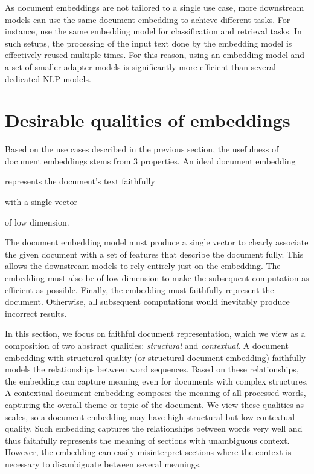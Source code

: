As document embeddings are not tailored to a single use case, more downstream models can use the same document embedding to achieve different tasks. For instance, \cite{neelakantan2022text,cohan2020specter} use the same embedding model for classification and retrieval tasks. In such setups,  the processing of  the input text done by the embedding model is effectively reused multiple times. For this reason, using an embedding model and a set of smaller adapter models is significantly more efficient than several dedicated NLP models.

\section{Desirable qualities of embeddings}

Based on the use cases described in the previous section, the usefulness of document embeddings stems from 3 properties. An ideal document embedding
\begin{enumerate*}[label=(\arabic*)]
  \item represents the document's text faithfully
  \item with a single vector
  \item of low dimension.
\end{enumerate*} The document embedding model must produce a single vector to clearly associate the given document with a set of features that describe the document fully. This allows the downstream models to rely entirely just on the embedding. The embedding must also be of low dimension to make the subsequent computation as efficient as possible. Finally, the embedding must faithfully represent the document. Otherwise, all subsequent computations would inevitably produce incorrect results.

In this section, we focus on faithful document representation, which we view as
a composition of two abstract qualities: \emph{structural} and
\emph{contextual}. A document embedding with structural quality (or structural
document embedding) faithfully models the relationships between word
sequences. Based on these relationships, the embedding can capture meaning even
for documents with complex structures. A contextual document
embedding composes the meaning of all processed words, capturing the overall
theme or topic of the document. We view these qualities as scales, so a
document embedding may have high structural but low contextual quality.
Such embedding captures the relationships between words very well and thus
faithfully represents the meaning of sections with unambiguous context.
However, the embedding can easily misinterpret sections where the context is
necessary to disambiguate between several meanings.

